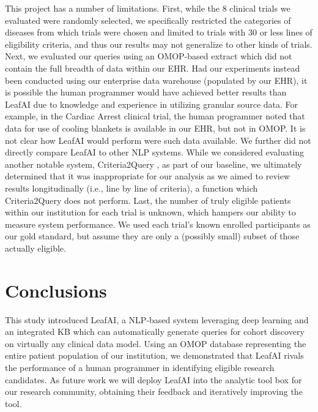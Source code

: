 \documentclass[../main.tex]{subfiles}
\begin{document}
This project has a number of limitations. First, while the 8 clinical trials we evaluated were randomly selected, we specifically restricted the categories of diseases from which trials were chosen and limited to trials with 30 or less lines of eligibility criteria, and thus our results may not generalize to other kinds of trials. Next, we evaluated our queries using an OMOP-based extract which did not contain the full breadth of data within our EHR. Had our experiments instead been conducted using our enterprise data warehouse (populated by our EHR), it is possible the human programmer would have achieved better results than LeafAI due to knowledge and experience in utilizing granular source data. For example, in the Cardiac Arrest clinical trial, the human programmer noted that data for use of cooling blankets is available in our EHR, but not in OMOP. It is not clear how LeafAI would perform were such data available. We further did not directly compare LeafAI to other NLP systems. While we considered evaluating another notable system, Criteria2Query \cite{yuan2019criteria2query}, as part of our baseline, we ultimately determined that it was inappropriate for our analysis as we aimed to review results longitudinally (i.e., line by line of criteria), a function which Criteria2Query does not perform. Last, the number of truly eligible patients within our institution for each trial is unknown, which hampers our ability to measure system performance. We used each trial’s known enrolled participants as our gold standard, but assume they are only a (possibly small) subset of those actually eligible.

\section{Conclusions}

This study introduced LeafAI, a NLP-based system leveraging deep learning and an integrated KB which can automatically generate queries for cohort discovery on virtually any clinical data model. Using an OMOP database representing the entire patient population of our institution, we demonstrated that LeafAI rivals the  performance of a human programmer in identifying eligible research candidates. As future work we will deploy LeafAI into the analytic tool box for our  research community, obtaining their feedback and iteratively improving the  tool.
\end{document}
